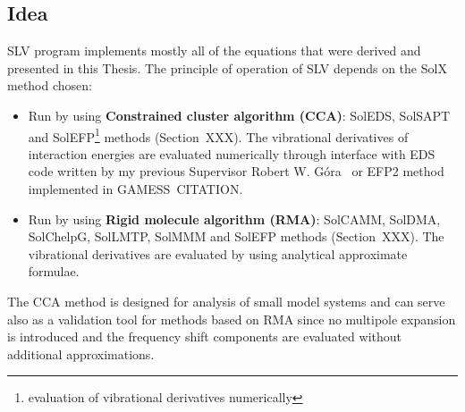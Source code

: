 \documentclass[a4paper,titlepage,twoside,fleqn,12pt]{book}
\begin{document}
\begin{refsection}
\section{Idea}

SLV program implements mostly all of the equations that were derived
and presented in this Thesis. 
The principle of operation of SLV depends on the SolX method chosen:
%
\begin{itemize}
  \item Run by using {\bf Constrained cluster algorithm (CCA)}:
        SolEDS, SolSAPT and SolEFP\footnote{evaluation of vibrational derivatives numerically} 
        methods (Section~XXX). The vibrational derivatives of interaction
        energies are evaluated numerically through interface with EDS code
        written by my previous Supervisor Robert W. G{\'o}ra~\citep{Gora.EDS.1998-2010}
        or EFP2 method implemented in {\sc GAMESS}~CITATION.
  \item Run by using {\bf Rigid molecule algorithm (RMA)}:
        SolCAMM, SolDMA, SolChelpG, SolLMTP, SolMMM and SolEFP methods (Section~XXX).
        The vibrational derivatives are evaluated by using analytical approximate formulae.
\end{itemize}
%
The CCA method is designed for analysis of small model systems
and can serve also as a validation tool for methods based on RMA
since no multipole expansion is introduced and the frequency shift
components are evaluated without additional approximations.


\end{refsection}
\end{document}
